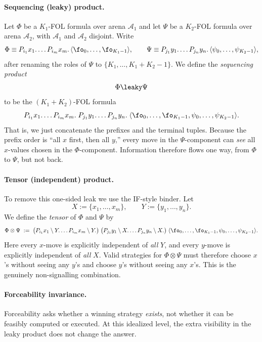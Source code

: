 \paragraph{Sequencing (leaky) product.}
Let $\Phi$ be a $K_1$-FOL formula over arena $\mathcal A_1$ and let $\Psi$
be a $K_2$-FOL formula over arena $\mathcal A_2$, with $\mathcal A_1$ and
$\mathcal A_2$ disjoint.
Write
\[
\Phi \equiv P_{i_1} x_1.\dots P_{i_m} x_m.\,\langle \fo_0,\dots,\fo_{K_1-1}\rangle,
\qquad
\Psi \equiv P_{j_1} y_1.\dots P_{j_n} y_n.\,\langle \psi_0,\dots,\psi_{K_2-1}\rangle,
\]
after renaming the roles of $\Psi$ to
$\{K_1,\dots,K_1{+}K_2{-}1\}$.
We define the \emph{sequencing product}
\[
  \Phi \leaky \Psi
\]
to be the $(K_1{+}K_2)$-FOL formula
\[
P_{i_1} x_1.\dots P_{i_m} x_m.\;
P_{j_1} y_1.\dots P_{j_n} y_n.\;
\langle \fo_0,\dots,\fo_{K_1-1},\psi_0,\dots,\psi_{K_2-1}\rangle.
\]
That is, we just concatenate the prefixes and the terminal tuples.
Because the prefix order is ``all $x$ first, then all $y$,'' every move in the
$\Psi$-component can \emph{see} all $x$-values chosen in the $\Phi$-component.
Information therefore flows one way, from $\Phi$ to $\Psi$, but not back.

\paragraph{Tensor (independent) product.}
To remove this one-sided leak we use the IF-style binder. Let
\[
X := \{x_1,\dots,x_m\}, \qquad Y := \{y_1,\dots,y_n\}.
\]
We define the \emph{tensor} of $\Phi$ and $\Psi$ by
\[
\Phi \otimes \Psi
\;:=\;
\bigl(P_{i_1} x_1 \setminus Y.\dots P_{i_m} x_m \setminus Y.\bigr)\;
\bigl(P_{j_1} y_1 \setminus X.\dots P_{j_n} y_n \setminus X.\bigr)\;
\langle \fo_0,\dots,\fo_{K_1-1},\psi_0,\dots,\psi_{K_2-1}\rangle.
\]
Here every $x$-move is explicitly independent of \emph{all} $Y$, and every
$y$-move is explicitly independent of \emph{all} $X$. Valid strategies for
$\Phi \otimes \Psi$ must therefore choose $x$'s without seeing any $y$'s and
choose $y$'s without seeing any $x$'s. This is the genuinely non-signalling
combination.

\paragraph{Forceability invariance.}
Forceability asks whether a winning strategy \emph{exists}, not whether
it can be feasibly computed or executed. At this idealized level, the
extra visibility in the leaky product does not change the answer.

